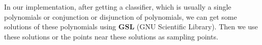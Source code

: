 In our implementation, after getting a classifier, which is usually a single polynomials or conjunction or disjunction of polynomials,
we can get some solutions of these polynomials using \textbf{GSL} (GNU Scientific Library).
Then we use these solutions or the points near these solutions as sampling points.
